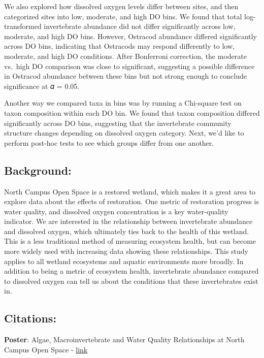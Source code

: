 \documentclass[
  letterpaper,
  DIV=11,
  numbers=noendperiod]{scrartcl}
\begin{document}
We also explored how dissolved oxygen levels differ between sites, and
then categorized sites into low, moderate, and high DO bins. We found
that total log-transformed invertebrate abundance did not differ
significantly across low, moderate, and high DO bins. However, Ostracod
abundance differed significantly across DO bins, indicating that
Ostracods may respond differently to low, moderate, and high DO
conditions. After Bonferroni correction, the moderate vs.~high DO
comparison was close to significant, suggesting a possible difference in
Ostracod abundance between these bins but not strong enough to conclude
significance at 𝛼 = 0.05.

Another way we compared taxa in bins was by running a Chi-square test on
taxon composition within each DO bin. We found that taxon composition
differed significantly across DO bins, suggesting that the invertebrate
community structure changes depending on dissolved oxygen category.
Next, we'd like to perform post-hoc tests to see which groups differ
from one another.

\subsection{Background:}\label{background}

North Campus Open Space is a restored wetland, which makes it a great
area to explore data about the effects of restoration. One metric of
restoration progress is water quality, and dissolved oxygen
concentration is a key water-quality indicator. We are interested in the
relationship between invertebrate abundance and dissolved oxygen, which
ultimately ties back to the health of this wetland. This is a less
traditional method of measuring ecosystem health, but can become more
widely used with increasing data showing these relationships. This study
applies to all wetland ecosystems and aquatic environments more broadly.
In addition to being a metric of ecosystem health, invertebrate
abundance compared to dissolved oxygen can tell us about the conditions
that these invertebrates exist in.

\subsection{Citations:}\label{citations}

\textbf{Poster}: Algae, Macroinvertebrate and Water Quality
Relationships at North Campus Open Space -
\href{https://escholarship.org/uc/item/98b837q4}{link}
\end{document}
